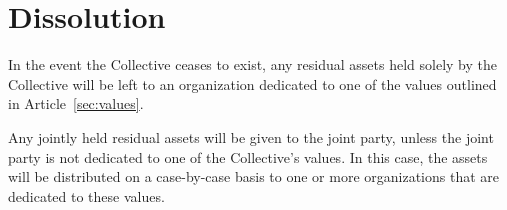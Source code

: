 \chapter{Dissolution}\label{sec:dissolution}
In the event the Collective ceases to exist, any residual assets held solely by the Collective will be left to an organization dedicated to one of the values outlined in Article~\ref{sec:values}.

Any jointly held residual assets will be given to the joint party, unless the joint party is not dedicated to one of the Collective's values. In this case, the assets will be distributed on a case-by-case basis to one or more organizations that are dedicated to these values.
